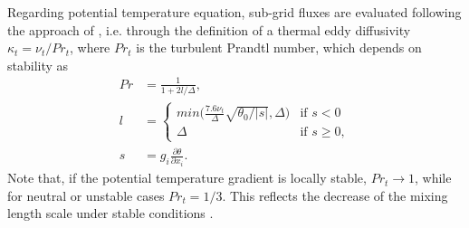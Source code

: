\documentclass[journal abbreviation, manuscript]{copernicus}
\begin{document}
Regarding potential temperature equation, sub-grid fluxes are evaluated following the approach of \cite{1984_Moeng}, i.e. through the definition of a thermal eddy diffusivity $\kappa_t = \nu_t/Pr_t$, where $Pr_t$ is the turbulent Prandtl number, which depends on stability as
\begin{align}
	\mathit{Pr} &= \frac{1}{1+2l/\Delta} , \label{eq:Prt} \\
	\mathit{l}  &= \begin{cases} 
		\mathit{min\big(\frac{7.6\nu_t}{\Delta}\sqrt{\theta_{0}/|s|}, \Delta\big)} & \mbox{if } s< 0 \\[18pt]
		\Delta                                                            & \mbox{if } s \ge 0,
	\end{cases} \nonumber\\ 
	\mathit{s} &= g_{i} \frac{\partial \theta}{\partial x_i}. \nonumber
\end{align}
Note that, if the potential temperature gradient is locally stable, $Pr_t\rightarrow1$, while for neutral or unstable cases $Pr_t = 1/3$. This reflects the decrease of the mixing length scale under stable conditions \citep{1991_Shumann}.
\end{document}
